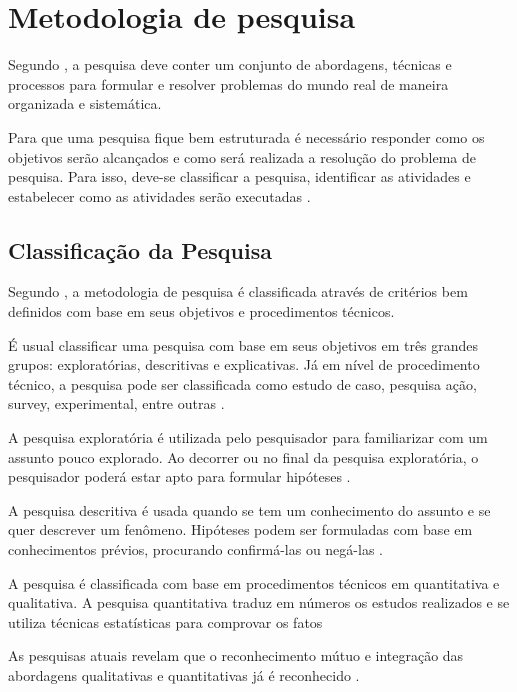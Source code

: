 \chapter{Metodologia de pesquisa}

Segundo , a pesquisa deve conter um conjunto de abordagens, técnicas e processos para formular e resolver problemas do mundo real de maneira organizada e sistemática.

Para que uma pesquisa fique bem estruturada é necessário responder como os objetivos serão alcançados e  como será realizada a resolução do problema de pesquisa. Para isso, deve-se classificar a pesquisa, identificar as atividades e estabelecer como as atividades serão executadas \cite{forcon2014}.

\section{Classificação da Pesquisa}

Segundo , a metodologia de pesquisa é classificada através de critérios bem definidos com base em seus objetivos e procedimentos técnicos.

É usual classificar uma pesquisa com base em seus objetivos em três grandes grupos: exploratórias, descritivas e explicativas. Já em nível de procedimento técnico, a pesquisa pode ser classificada como estudo de caso, pesquisa ação, survey, experimental, entre outras .

A pesquisa exploratória é utilizada pelo pesquisador para familiarizar com um assunto pouco explorado. Ao decorrer ou no final da pesquisa exploratória, o pesquisador poderá estar apto para formular hipóteses \cite{giudice}.

A pesquisa descritiva é usada quando se tem um conhecimento do assunto e se quer descrever um fenômeno. Hipóteses podem ser formuladas com base em conhecimentos prévios, procurando confirmá-las ou negá-las \cite[pág.~21]{fonseca2002}.

A pesquisa é classificada com base em procedimentos técnicos em quantitativa e qualitativa. A pesquisa quantitativa traduz em números os estudos realizados e se utiliza técnicas estatísticas para comprovar os fatos \cite[pág.~9]{rodrigues2007}


As pesquisas atuais revelam que o reconhecimento mútuo e integração das abordagens qualitativas e quantitativas já é reconhecido \cite{serapioni}.

